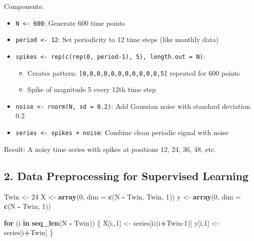 \documentclass[
]{article}
\newenvironment{Shaded}{\begin{snugshade}}{\end{snugshade}}
\newcommand{\AttributeTok}[1]{\textcolor[rgb]{0.13,0.29,0.53}{#1}}
\newcommand{\ControlFlowTok}[1]{\textcolor[rgb]{0.13,0.29,0.53}{\textbf{#1}}}
\newcommand{\DecValTok}[1]{\textcolor[rgb]{0.00,0.00,0.81}{#1}}
\newcommand{\FunctionTok}[1]{\textcolor[rgb]{0.13,0.29,0.53}{\textbf{#1}}}
\newcommand{\NormalTok}[1]{#1}
\newcommand{\OtherTok}[1]{\textcolor[rgb]{0.56,0.35,0.01}{#1}}
\newcommand{\SpecialCharTok}[1]{\textcolor[rgb]{0.81,0.36,0.00}{\textbf{#1}}}
\providecommand{\tightlist}{%
  \setlength{\itemsep}{0pt}\setlength{\parskip}{0pt}}
\begin{document}
Components:

\begin{itemize}
\tightlist
\item
  \texttt{N\ \textless{}-\ 600}: Generate 600 time points
\item
  \texttt{period\ \textless{}-\ 12}: Set periodicity to 12 time steps
  (like monthly data)
\item
  \texttt{spikes\ \textless{}-\ rep(c(rep(0,\ period-1),\ 5),\ length.out\ =\ N)}:

  \begin{itemize}
  \tightlist
  \item
    Creates pattern: \texttt{{[}0,0,0,0,0,0,0,0,0,0,0,5{]}} repeated for
    600 points
  \item
    Spike of magnitude 5 every 12th time step
  \end{itemize}
\item
  \texttt{noise\ \textless{}-\ rnorm(N,\ sd\ =\ 0.2)}: Add Gaussian
  noise with standard deviation 0.2
\item
  \texttt{series\ \textless{}-\ spikes\ +\ noise}: Combine clean
  periodic signal with noise
\end{itemize}

Result: A noisy time series with spikes at positions 12, 24, 36, 48,
etc.

\subsection{2. Data Preprocessing for Supervised
Learning}\label{data-preprocessing-for-supervised-learning}

\begin{Shaded}
\begin{Highlighting}[]
\NormalTok{Twin }\OtherTok{\textless{}{-}} \DecValTok{24}
\NormalTok{X }\OtherTok{\textless{}{-}} \FunctionTok{array}\NormalTok{(}\DecValTok{0}\NormalTok{, }\AttributeTok{dim =} \FunctionTok{c}\NormalTok{(N }\SpecialCharTok{{-}}\NormalTok{ Twin, Twin, }\DecValTok{1}\NormalTok{))}
\NormalTok{y }\OtherTok{\textless{}{-}} \FunctionTok{array}\NormalTok{(}\DecValTok{0}\NormalTok{, }\AttributeTok{dim =} \FunctionTok{c}\NormalTok{(N }\SpecialCharTok{{-}}\NormalTok{ Twin, }\DecValTok{1}\NormalTok{))}

\ControlFlowTok{for}\NormalTok{ (i }\ControlFlowTok{in} \FunctionTok{seq\_len}\NormalTok{(N }\SpecialCharTok{{-}}\NormalTok{ Twin)) \{}
\NormalTok{  X[i,,}\DecValTok{1}\NormalTok{] }\OtherTok{\textless{}{-}}\NormalTok{ series[i}\SpecialCharTok{:}\NormalTok{(i}\SpecialCharTok{+}\NormalTok{Twin}\DecValTok{{-}1}\NormalTok{)]}
\NormalTok{  y[i,}\DecValTok{1}\NormalTok{]  }\OtherTok{\textless{}{-}}\NormalTok{ series[i}\SpecialCharTok{+}\NormalTok{Twin]}
\NormalTok{\}}
\end{Highlighting}
\end{Shaded}
\end{document}
